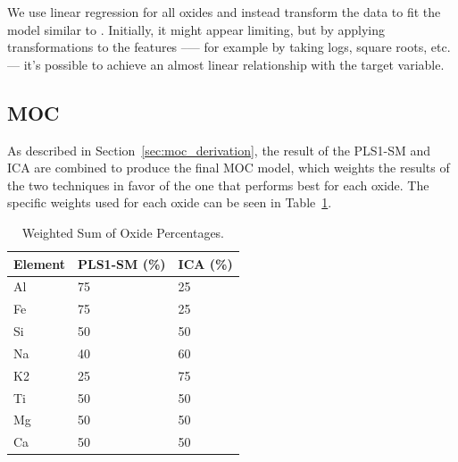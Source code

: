 We use linear regression for all oxides and instead transform the data to fit the model similar to \citet{kuo_detecting_2018}.
Initially, it might appear limiting, but by applying transformations to the features --— for example by taking logs, square roots, etc. --- it's possible to achieve an almost linear relationship with the target variable.

\subsection{MOC}\label{sec:methodology_moc}
As described in Section~\ref{sec:moc_derivation}, the result of the PLS1-SM and ICA are combined to produce the final MOC model, which weights the results of the two techniques in favor of the one that performs best for each oxide.
The specific weights used for each oxide can be seen in Table~\ref{tab:weighted_sum_oxide}.

\begin{table}[h]
\centering
\begin{tabular*}{\columnwidth}{@{\extracolsep{\fill}}lll}
\toprule
Element  & PLS1-SM (\%) & ICA (\%) \\ \midrule
Al       & 75           & 25      \\
Fe       & 75           & 25      \\
Si       & 50           & 50      \\
Na       & 40           & 60      \\
K2       & 25           & 75      \\
Ti       & 50           & 50      \\
Mg       & 50           & 50      \\
Ca       & 50           & 50      \\
\bottomrule
\end{tabular*}
\caption{Weighted Sum of Oxide Percentages.}
\label{tab:weighted_sum_oxide}
\end{table}